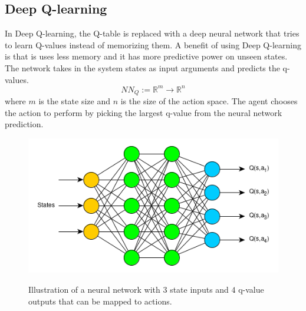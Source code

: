 \documentclass{LTHtwocol} %
\begin{document}
\subsection{Deep Q-learning}
In Deep Q-learning, the Q-table is replaced with a deep neural network \cite{Deep_Q_Learning_First} that tries to learn Q-values instead of memorizing them.
A benefit of using Deep Q-learning is that is uses less memory and it has more predictive power on unseen states.
The network takes in the system states as input arguments and predicts the q-values.
\begin{equation}
	\label{eqn:neural_network_mapping}
	NN_Q := \mathbb{R}^m \to \mathbb{R}^n
\end{equation}
where $m$ is the state size and $n$ is the size of the action space.
The agent chooses the action to perform by picking the largest q-value from the neural network prediction.
\begin{figure}[H]
	\centering
	\includegraphics[width=0.9\columnwidth]{figures/q_network.png}
	\label{fig:q_network_illustration}
	\caption{Illustration of a neural network with $3$ state inputs and $4$ q-value outputs that can be mapped to actions.}
\end{figure}
\end{document}
